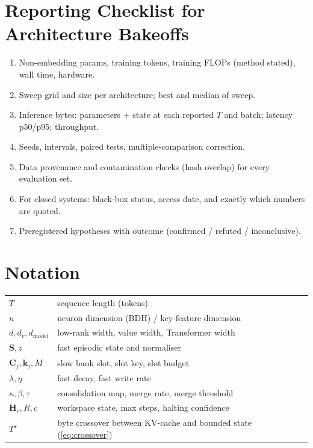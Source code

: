 \documentclass[10pt]{article}
\theoremstyle{remark}
\newcommand{\Sm}{\mathbf{S}}
\newcommand{\Cm}{\mathbf{C}}
\newcommand{\Hm}{\mathbf{H}}
\begin{document}
\section{Reporting Checklist for Architecture Bakeoffs}
\label{app:checklist}
\begin{enumerate}[leftmargin=*,itemsep=0pt]
\item Non-embedding params, training tokens, training FLOPs (method stated), wall time, hardware.
\item Sweep grid and size per architecture; best and median of sweep.
\item Inference bytes: parameters + state at each reported $T$ and batch; latency p50/p95; throughput.
\item Seeds, intervals, paired tests, multiple-comparison correction.
\item Data provenance and contamination checks (hash overlap) for every evaluation set.
\item For closed systems: black-box status, access date, and exactly which numbers are quoted.
\item Preregistered hypotheses with outcome (confirmed / refuted / inconclusive).
\end{enumerate}

\section{Notation}
\label{app:notation}
\begin{tabular}{@{}ll@{}}
$T$ & sequence length (tokens)\\
$n$ & neuron dimension (BDH) / key-feature dimension\\
$d,d_v,d_{\text{model}}$ & low-rank width, value width, Transformer width\\
$\Sm,z$ & fast episodic state and normaliser\\
$\Cm_j,\mathbf{k}_j,M$ & slow bank slot, slot key, slot budget\\
$\lambda,\eta$ & fast decay, fast write rate\\
$\kappa,\beta,\tau$ & consolidation map, merge rate, merge threshold\\
$\Hm_r,R,c$ & workspace state, max steps, halting confidence\\
$T^\star$ & byte crossover between KV-cache and bounded state (\cref{eq:crossover})\\
\end{tabular}
\end{document}
